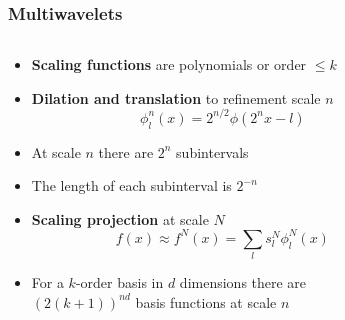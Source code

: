 \begin{frame}
    \frametitle{Multiwavelets}
    \scriptsize
    \begin{columns}
    \begin{column}[b]{0.65\linewidth}
    \begin{itemize}
        \item   \textbf{Scaling functions} are polynomials or order $\leq k$
        \pause
        \item   \textbf{Dilation and translation} to refinement scale $n$
	        \begin{equation}
		    \nonumber
		    \phi_l^n(x) = 2^{n/2}\phi(2^nx-l)
	        \end{equation}
        \item   At scale $n$ there are $2^n$ subintervals
        \item   The length of each subinterval is $2^{-n}$
        \item   \textbf{Scaling projection} at scale $N$
	        \begin{equation}
		    \nonumber
		    f(x) \approx f^N(x) = \sum_l s_l^N \phi_l^N(x)
	        \end{equation}
        \pause
        \item   For a $k$-order basis in $d$ dimensions there are\\
	        $\left(2(k+1)\right)^{nd}$ basis functions at scale $n$\\
    \end{itemize}
    \end{column}
    \begin{column}[b]{0.35\linewidth}
    \centering
\end{column}
\end{columns}
\end{frame}
